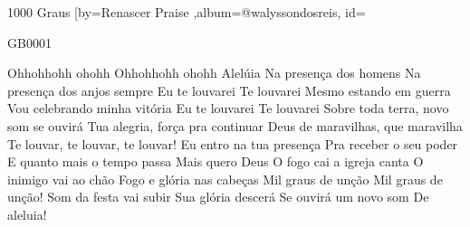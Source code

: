 \beginsong
{1000 Graus %
}[by={Renascer Praise %
},album={@walyssondosreis},
id={GB0001 %

\beginverse
Ohhohhohh ohohh
Ohhohhohh ohohh
Alelúia
\endverse
\beginverse
Na presença dos homens
Na presença dos anjos sempre
Eu te louvarei
Te louvarei
\endverse
\beginverse
Mesmo estando em guerra
Vou celebrando minha vitória
Eu te louvarei
Te louvarei
\endverse
\beginverse
Sobre toda terra, novo som se ouvirá
Tua alegria, força pra continuar
Deus de maravilhas, que maravilha
Te louvar, te louvar, te louvar!
\endverse
\beginchorus
Eu entro na tua presença
Pra receber o seu poder
E quanto mais o tempo passa
Mais quero Deus
O fogo cai a igreja canta
O inimigo vai ao chão
Fogo e glória nas cabeças
Mil graus de unção
Mil graus de unção!
\endchorus
\beginverse
Som da festa vai subir
Sua glória descerá
Se ouvirá um novo som
De aleluia!

}
